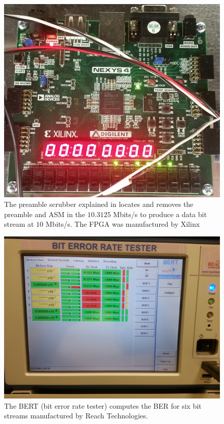 \begin{figure}
	\centering\includegraphics[scale=0.5]{figures/eq_GPUimplementation/scrubber.jpg}
	\caption{The preamble scrubber explained in \cite{hog2016} locates and removes the preamble and ASM in the $10.3125$ Mbits/s to produce a data bit stream at $10$ Mbits/s. The FPGA was manufactured by Xilinx}
	\label{fig:scrubber}
\end{figure}
\begin{figure}
	\centering\includegraphics[scale=0.1]{figures/eq_GPUimplementation/20150912_194530.jpg}
	\caption{The BERT (bit error rate tester) computes the BER for six bit streams manufactured by Reach Technologies.}
	\label{fig:BERT}
\end{figure}

